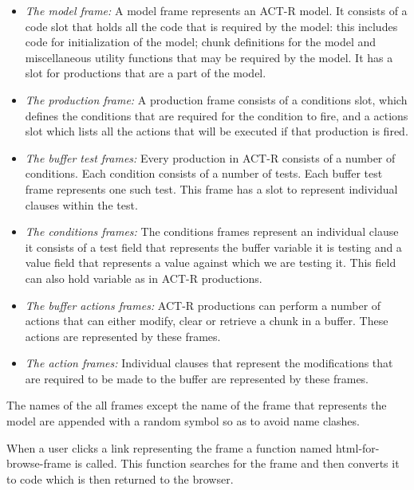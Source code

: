 \begin{itemize}
\item \emph{The model frame:} A model frame represents an ACT-R
  model. It consists of a code slot that holds all the code that is
  required by the model: this includes code for initialization of the
  model; chunk definitions for the model and miscellaneous utility functions that may be required by
  the model. It has a slot for productions that are a part of the
  model.
\item \emph{The production frame:} A production frame consists of a
  conditions slot, which defines the conditions that are required for
  the condition to fire, and a actions slot which lists all the
  actions that will be executed if that production is fired.
\item \emph{The buffer test frames:} Every production in ACT-R consists
  of a number of conditions. Each condition consists of a number of
  tests. Each buffer test frame represents one such test. This frame
  has a slot to represent individual clauses within the test.
\item \emph{The conditions frames:} The conditions frames represent an
  individual clause it consists of a test field that represents the
  buffer variable it is testing and a value field that represents a
  value against which we are testing it. This field can also hold
  variable as in ACT-R productions.
\item \emph{The buffer actions frames:} ACT-R productions can perform
  a number of actions that can either modify, clear or retrieve a
  chunk in a buffer. These actions are represented by these frames.
\item \emph{The action frames:} Individual clauses that represent the
  modifications that are required to be made to the buffer are
  represented by these frames.
\end{itemize}

The names of the all frames except the name of the frame that represents
the model are appended with a random symbol so as to avoid name
clashes. 


When a user clicks a link representing the frame a function named
html-for-browse-frame is called. This function searches for the frame
and then converts it to code which is then returned to the browser.



